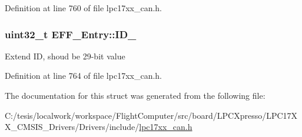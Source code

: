 \-Definition at line 760 of file lpc17xx\-\_\-can.\-h.

\hypertarget{struct_e_f_f___entry_a83996eef6ddfa50bea2d38f628024531}{
\subsubsection[{\-I\-D\-\_\-29}]{\setlength{\rightskip}{0pt plus 5cm}uint32\-\_\-t {\bf \-E\-F\-F\-\_\-\-Entry\-::\-I\-D\-\_}}}\label{struct_e_f_f___entry_a83996eef6ddfa50bea2d38f628024531}
\-Extend \-I\-D, shoud be 29-\/bit value 

\-Definition at line 764 of file lpc17xx\-\_\-can.\-h.



\-The documentation for this struct was generated from the following file\-:\begin{DoxyCompactItemize}
\item 
\-C\-:/tesis/localwork/workspace/\-Flight\-Computer/src/board/\-L\-P\-C\-Xpresso/\-L\-P\-C17\-X\-X\-\_\-\-C\-M\-S\-I\-S\-\_\-\-Drivers/\-Drivers/include/\hyperlink{lpc17xx__can_8h}{lpc17xx\-\_\-can.\-h}\end{DoxyCompactItemize}
